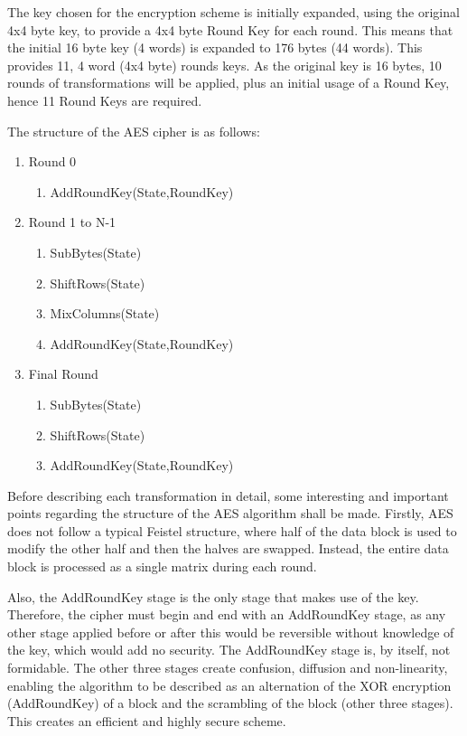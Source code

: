 \documentclass[a4paper,12pt]{report}
\begin{document}
The key chosen for the encryption scheme is initially expanded, using the original 4x4 byte key, to provide a 4x4 byte Round Key for each round. This means that the initial 16 byte key (4 words) is expanded to 176 bytes (44 words). This provides 11, 4 word (4x4 byte) rounds keys. As the original key is 16 bytes, 10 rounds of transformations will be applied, plus an initial usage of a Round Key, hence 11 Round Keys are required.

The structure of the AES cipher is as follows:

\begin{enumerate}
 \item Round 0 
 \begin{enumerate}
  \item AddRoundKey(State,RoundKey) 
 \end{enumerate}
 \item Round 1 to N-1
 \begin{enumerate}
  \item SubBytes(State) 
  \item ShiftRows(State) 
  \item MixColumns(State)
  \item AddRoundKey(State,RoundKey) 
 \end{enumerate}
 \item Final Round
 \begin{enumerate}
  \item SubBytes(State) 
  \item ShiftRows(State)
  \item AddRoundKey(State,RoundKey) 
 \end{enumerate}
\end{enumerate}

Before describing each transformation in detail, some interesting and important points regarding the structure of the AES algorithm shall be made. Firstly, AES does not follow a typical Feistel structure, where half of the data block is used to modify the other half and then the halves are swapped. Instead, the entire data block is processed as a single matrix during each round. 

Also, the AddRoundKey stage is the only stage that makes use of the key. Therefore, the cipher must begin and end with an AddRoundKey stage, as any other stage applied before or after this would be reversible without knowledge of the key, which would add no security. The AddRoundKey stage is, by itself, not formidable. The other three stages create confusion, diffusion and non-linearity, enabling the algorithm to be described as an alternation of the XOR encryption (AddRoundKey) of a block and the scrambling of the block (other three stages). This creates an efficient and highly secure scheme. 
\end{document}
